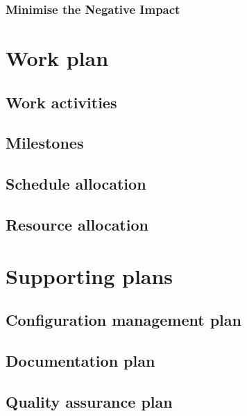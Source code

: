 \documentclass[11pt, a4paper]{report}
\begin{document}
\subsection{Minimise the Negative Impact}


\chapter{Work plan}



\section{Work activities}



\section{Milestones}

\section{Schedule allocation}

\section{Resource allocation}

\pagebreak


\chapter{Supporting plans}

\section{Configuration management plan}

\section{Documentation plan}

\section{Quality assurance plan}

\pagebreak


\newpage
\appendix

\pagebreak

\chapter{}
\end{document}
